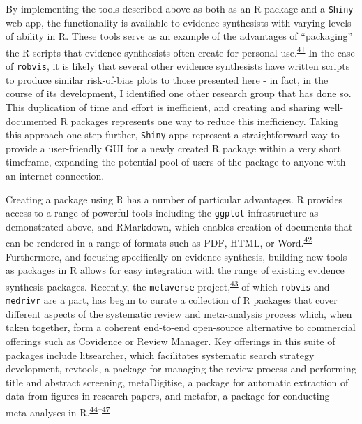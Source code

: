 \documentclass[a4paper, nobind]{templates/ociamthesis}
\begin{document}
By implementing the tools described above as both as an R package and a \texttt{Shiny} web app, the functionality is available to evidence synthesists with varying levels of ability in R. These tools serve as an example of the advantages of ``packaging'' the R scripts that evidence synthesists often create for personal use.\textsuperscript{\protect\hyperlink{ref-wickham2015r}{41}} In the case of \texttt{robvis}, it is likely that several other evidence synthesists have written scripts to produce similar risk-of-bias plots to those presented here - in fact, in the course of its development, I identified one other research group that has done so. This duplication of time and effort is inefficient, and creating and sharing well-documented R packages represents one way to reduce this inefficiency. Taking this approach one step further, \texttt{Shiny} apps represent a straightforward way to provide a user-friendly GUI for a newly created R package within a very short timeframe, expanding the potential pool of users of the package to anyone with an internet connection.

Creating a package using R has a number of particular advantages. R provides access to a range of powerful tools including the \texttt{ggplot} infrastructure as demonstrated above, and RMarkdown, which enables creation of documents that can be rendered in a range of formats such as PDF, HTML, or Word.\textsuperscript{\protect\hyperlink{ref-xie2018r}{42}} Furthermore, and focusing specifically on evidence synthesis, building new tools as packages in R allows for easy integration with the range of existing evidence synthesis packages. Recently, the \texttt{metaverse} project,\textsuperscript{\protect\hyperlink{ref-variousauthors2020}{43}} of which \texttt{robvis} and \texttt{medrivr} are a part, has begun to curate a collection of R packages that cover different aspects of the systematic review and meta-analysis process which, when taken together, form a coherent end-to-end open-source alternative to commercial offerings such as Covidence or Review Manager. Key offerings in this suite of packages include litsearcher, which facilitates systematic search strategy development, revtools, a package for managing the review process and performing title and abstract screening, metaDigitise, a package for automatic extraction of data from figures in research papers, and metafor, a package for conducting meta-analyses in R.\textsuperscript{\protect\hyperlink{ref-grames2019automated}{44}--\protect\hyperlink{ref-westgate2019revtools}{47}}
\end{document}
